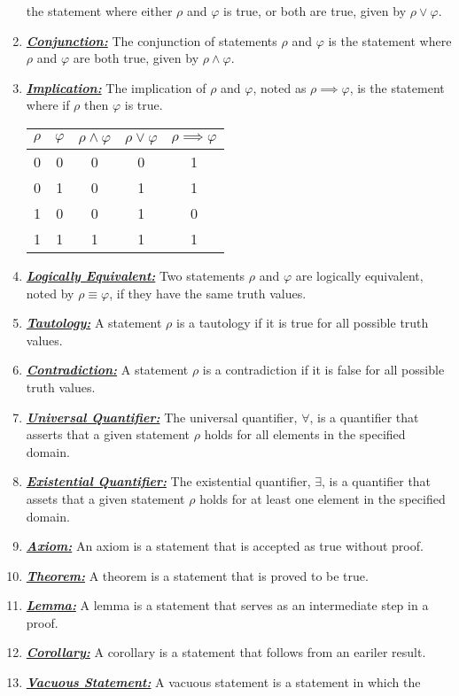 \documentclass{article}
\newcommand{\deff}[1]{\textbf{\textit{\underline{#1}}}}
\begin{document}
\begin{enumerate}
the statement where either $\rho$ and $\varphi$ is true, or both are true, given
by $\rho\lor\varphi$.
\item \deff{Conjunction:} The conjunction of statements $\rho$ and $\varphi$ is
the statement where $\rho$ and $\varphi$ are both true, given by $\rho\land\varphi$.
\item \deff{Implication:} The implication of $\rho$ and $\varphi$, noted as
$\rho\implies\varphi$, is the statement where if $\rho$ then $\varphi$ is true.
\begin{center}
\begin{tabular}{c|c|c|c|c}
$\rho$ & $\varphi$ & $\rho\land\varphi$ & $\rho\lor\varphi$ & $\rho\implies\varphi$\\
\hline
0 & 0 & 0 & 0 & 1\\
0 & 1 & 0 & 1 & 1\\
1 & 0 & 0 & 1 & 0\\
1 & 1 & 1 & 1 & 1
\end{tabular}
\end{center}
\item \deff{Logically Equivalent:} Two statements $\rho$ and $\varphi$ are
logically equivalent, noted by $\rho\equiv\varphi$, if they have the same truth
values.
\item \deff{Tautology:} A statement $\rho$ is a tautology if it is true for all
possible truth values.
\item \deff{Contradiction:} A statement $\rho$ is a contradiction if it is false
for all possible truth values.
\item \deff{Universal Quantifier:} The universal quantifier, $\forall$, is a
quantifier that asserts that a given statement $\rho$ holds for all elements in
the specified domain.
\item \deff{Existential Quantifier:} The existential quantifier, $\exists$, is a
quantifier that assets that a given statement $\rho$ holds for at least one
element in the specified domain.
\item \deff{Axiom:} An axiom is a statement that is accepted as true without
proof.
\item \deff{Theorem:} A theorem is a statement that is proved to be true.
\item \deff{Lemma:} A lemma is a statement that serves as an intermediate step
in a proof.
\item \deff{Corollary:} A corollary is a statement that follows from an eariler
result.
\item \deff{Vacuous Statement:} A vacuous statement is a statement in which the

\end{enumerate}
\end{document}

